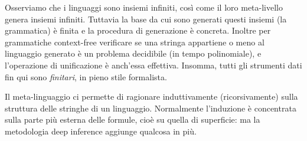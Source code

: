 \documentclass[12pt,a4paper,openright,twoside]{report}
\begin{document}
Osserviamo che i linguaggi sono insiemi infiniti, cos\`i come il loro meta-livello genera insiemi infiniti. Tuttavia la base da cui sono generati questi insiemi (la grammatica) \`e finita e la procedura di generazione \`e concreta. Inoltre per grammatiche context-free verificare se una stringa appartiene o meno al linguaggio generato \`e un problema decidibile (in tempo polinomiale), e l'operazione di unificazione \`e anch'essa effettiva. Insomma, tutti gli strumenti dati fin qui sono \emph{finitari}, in pieno stile formalista.

Il meta-linguaggio ci permette di ragionare induttivamente (ricorsivamente) sulla struttura delle stringhe di un linguaggio. Normalmente l'induzione \`e concentrata sulla parte pi\`u esterna delle formule, cio\`e su quella di superficie: ma la metodologia deep inference aggiunge qualcosa in pi\`u.
\end{document}
